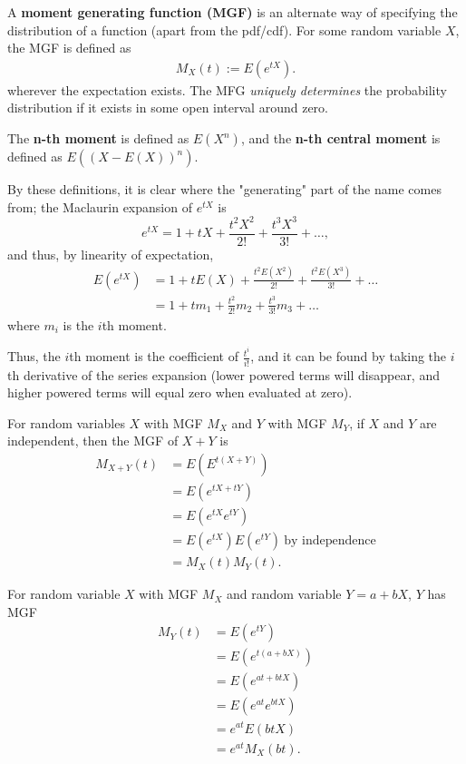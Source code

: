 \documentclass[a4paper,10pt]{article}
\begin{document}
A \textbf{moment generating function (MGF)} is an alternate way of specifying the distribution of a function (apart from the pdf/cdf). For some random variable $X$, the MGF is defined as 
\begin{align*}
    M_X(t) := E(e^{tX}).
\end{align*}
wherever the expectation exists. The MFG \textit{uniquely determines} the probability distribution if it exists in some open interval around zero. 

The \textbf{n-th moment} is defined as $E(X^n)$, and the \textbf{n-th central moment} is defined as $E\left(\left(X-E(X)\right)^n\right)$.

By these definitions, it is clear where the "generating" part of the name comes from; the Maclaurin expansion of $e^{tX}$ is 
\begin{equation*}
    e^{tX} = 1 + tX + \frac{t^2X^2}{2!} + \frac{t^3X^3}{3!} + \ldots,
\end{equation*}
and thus, by linearity of expectation, 
\begin{align*}
    E(e^{tX}) &= 1 + tE(X) + \frac{t^2E(X^2)}{2!} + \frac{t^2E(X^3)}{3!} + \ldots \\
              &= 1 + tm_1 + \frac{t^2}{2!}m_2 + \frac{t^3}{3!}m_3 + \ldots 
\end{align*}
where $m_i$ is the $i$th moment. 

Thus, the $i$th moment is the coefficient of $\frac{t^i}{i!}$, and it can be found by taking the $i$th derivative of the series expansion (lower powered terms will disappear, and higher powered terms will equal zero when evaluated at zero).  

For random variables $X$ with MGF $M_X$ and $Y$ with MGF $M_Y$, if $X$ and $Y$ are independent, then the MGF of $X+Y$ is 
\begin{align*}
    M_{X+Y}(t) &= E(E^{t(X+Y)}) \\
               &= E(e^{tX+tY}) \\
               &= E(e^{tX}e^{tY}) \\
               &= E(e^{tX})E(e^{tY})~\text{by independence} \\
               &= M_X(t)M_Y(t).
\end{align*}

For random variable $X$ with MGF $M_X$ and random variable $Y=a+bX$, $Y$ has MGF 
\begin{align*}
    M_Y(t) &= E(e^{tY}) \\
           &= E(e^{t(a+bX)}) \\
           &= E(e^{at + btX}) \\
           &= E(e^{at}e^{btX}) \\
           &= e^{at}E(btX) \\
           &= e^{at}M_X(bt).
\end{align*}
\end{document}
